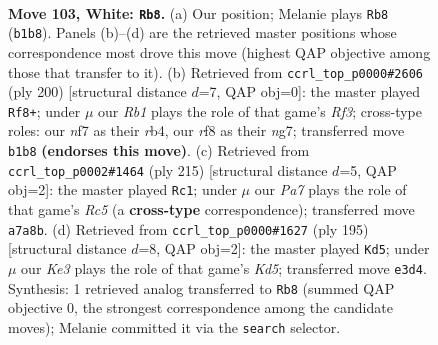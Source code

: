 \documentclass[11pt]{article}
\begin{document}
\clearpage

\begin{figure}[p]\centering
\begin{subfigure}{0.46\textwidth}\centering
\resizebox{\linewidth}{!}{%
\newchessgame
\chessboard[
  setfen={5r2/P2k1n2/8/8/8/4K3/8/1R6 w - - 5 103},
  showmover=false,
  pgfstyle=straightmove, color=movearrow, markmove={b1-b8}
]}
\caption{}
\end{subfigure}\hfill
\begin{subfigure}{0.46\textwidth}\centering
\resizebox{\linewidth}{!}{%
\newchessgame
\chessboard[
  setfen={6k1/4P1n1/8/3K4/1r6/5R2/8/8 w - - 3 101},
  showmover=false,
  pgfstyle=straightmove, color=movearrow, markmove={f3-f8}
]}
\caption{}
\end{subfigure}
\\[4pt]
\begin{subfigure}{0.46\textwidth}\centering
\resizebox{\linewidth}{!}{%
\newchessgame
\chessboard[
  setfen={8/r7/5N1K/5R2/2r5/8/6k1/8 b - - 57 108},
  showmover=false,
  pgfstyle=straightmove, color=movearrow, markmove={c4-c1}
]}
\caption{}
\end{subfigure}\hfill
\begin{subfigure}{0.46\textwidth}\centering
\resizebox{\linewidth}{!}{%
\newchessgame
\chessboard[
  setfen={8/8/5K2/8/3k4/R7/N5r1/8 b - - 0 98},
  showmover=false,
  pgfstyle=straightmove, color=movearrow, markmove={d4-d5}
]}
\caption{}
\end{subfigure}
\caption{\textbf{Move 103, White: \texttt{Rb8}.} (a) Our position; Melanie plays \texttt{Rb8} (\texttt{b1b8}). Panels (b)--(d) are the retrieved master positions whose correspondence most drove this move (highest QAP objective among those that transfer to it). (b) Retrieved from \texttt{ccrl\_top\_p0000\#2606} (ply 200) [structural distance $d$=7, QAP obj=0]: the master played \texttt{Rf8+}; under $\mu$ our \emph{Rb1} plays the role of that game's \emph{Rf3}; cross-type roles: our \emph{n}f7 as their \emph{r}b4, our \emph{r}f8 as their \emph{n}g7; transferred move \texttt{b1b8} \textbf{(endorses this move)}. (c) Retrieved from \texttt{ccrl\_top\_p0002\#1464} (ply 215) [structural distance $d$=5, QAP obj=2]: the master played \texttt{Rc1}; under $\mu$ our \emph{Pa7} plays the role of that game's \emph{Rc5} (a \textbf{cross-type} correspondence); transferred move \texttt{a7a8b}. (d) Retrieved from \texttt{ccrl\_top\_p0000\#1627} (ply 195) [structural distance $d$=8, QAP obj=2]: the master played \texttt{Kd5}; under $\mu$ our \emph{Ke3} plays the role of that game's \emph{Kd5}; transferred move \texttt{e3d4}. Synthesis: 1 retrieved analog transferred to \texttt{Rb8} (summed QAP objective 0, the strongest correspondence among the candidate moves); Melanie committed it via the \texttt{search} selector.}
\label{fig:thought-m204}
\end{figure}
\end{document}
